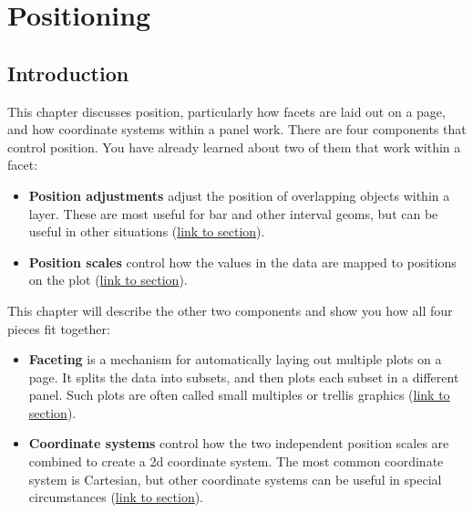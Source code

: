 \chapter{Positioning}\label{cha:position}

\section{Introduction}

This chapter discusses position, particularly how facets are laid out on
a page, and how coordinate systems within a panel work. There are four
components that control position. You have already learned about two of
them that work within a facet: 

\begin{itemize}
\item
  \textbf{Position adjustments} adjust the position of overlapping
  objects within a layer. These are most useful for bar and other
  interval geoms, but can be useful in other situations
  (\hyperref[sec:position]{link to section}).
\item
  \textbf{Position scales} control how the values in the data are mapped
  to positions on the plot (\hyperref[sub:scale-position]{link to
  section}).
\end{itemize}

This chapter will describe the other two components and show you how all
four pieces fit together:

\begin{itemize}
\item
  \textbf{Faceting} is a mechanism for automatically laying out multiple
  plots on a page. It splits the data into subsets, and then plots each
  subset in a different panel. Such plots are often called small
  multiples or trellis graphics (\hyperref[sec:faceting]{link to
  section}).
\item
  \textbf{Coordinate systems} control how the two independent position
  scales are combined to create a 2d coordinate system. The most common
  coordinate system is Cartesian, but other coordinate systems can be
  useful in special circumstances (\hyperref[sec:coord]{link to
  section}).
\end{itemize}


